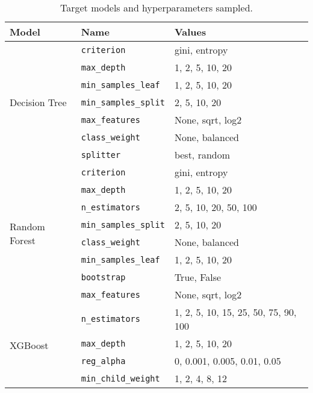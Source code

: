 \begin{table}[t]
    \caption{Target models and hyperparameters sampled.}%
    \label{table:parameters_combined}
    \small
    \centering
    \begin{tabular}{lll}
        \toprule
        {\bf Model} & {\bf Name} & {\bf Values}\\
        \midrule
        \multirow{7}{*}{Decision Tree} 
        & \texttt{criterion} & gini, entropy\\
        & \texttt{max\_depth} & 1, 2, 5, 10, 20\\
        & \texttt{min\_samples\_leaf} & 1, 2, 5, 10, 20\\
        & \texttt{min\_samples\_split} & 2, 5, 10, 20\\
        & \texttt{max\_features} & None, sqrt, log2\\
        & \texttt{class\_weight} & None, balanced\\
        & \texttt{splitter} & best, random\\
        \midrule
        \multirow{8}{*}{Random Forest} 
        & \texttt{criterion} & gini, entropy\\
        & \texttt{max\_depth} & 1, 2, 5, 10, 20\\
        & \texttt{n\_estimators} & 2, 5, 10, 20, 50, 100\\
        & \texttt{min\_samples\_split} & 2, 5, 10, 20\\
        & \texttt{class\_weight} & None, balanced\\
        & \texttt{min\_samples\_leaf} & 1, 2, 5, 10, 20\\
        & \texttt{bootstrap} & True, False\\
        & \texttt{max\_features} & None, sqrt, log2\\
        \midrule
        \multirow{4}{*}{XGBoost} 
        & \texttt{n\_estimators} & 1, 2, 5, 10, 15, 25, 50, 75, 90, 100\\
        & \texttt{max\_depth} & 1, 2, 5, 10, 20\\
        & \texttt{reg\_alpha} & 0, 0.001, 0.005, 0.01, 0.05\\
        & \texttt{min\_child\_weight} & 1, 2, 4, 8, 12\\
        \bottomrule
    \end{tabular}
\end{table}

